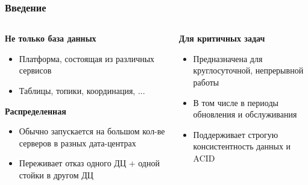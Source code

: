 \begin{frame}\frametitle{Введение}

    \begin{columns}[onlytextwidth,T]
        \begin{column}{0.5\textwidth}
            {
                \textbf<3>{Не только база данных}

                \begin{itemize}
                    \item Платформа, состоящая из различных сервисов
                    \item Таблицы, топики, координация, ...
                \end{itemize}
            }
            {
                \textbf<1>{Распределенная}

                \begin{itemize}
                    \item Обычно запускается на большом кол-ве серверов в разных дата-центрах
                    \item Переживает отказ одного ДЦ + одной стойки в другом ДЦ
                \end{itemize}
            }
        \end{column}

        \pause
        \begin{column}{0.5\textwidth}
            \textbf<2>{Для критичных задач}

            \begin{itemize}
                \item Предназначена для круглосуточной, непрерывной работы
                \item В том числе в периоды обновления и обслуживания
                \item Поддерживает строгую консистентность данных и ACID
            \end{itemize}
        \end{column}
    \end{columns}
\end{frame}

